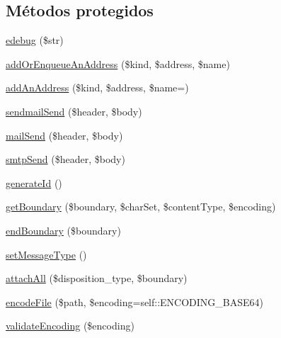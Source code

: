 \subsection*{Métodos protegidos}
\begin{DoxyCompactItemize}
\item 
\hyperlink{classPHPMailer_1_1PHPMailer_1_1PHPMailer_a39eadd6ab95a3dc3c7ec249fd694f021}{edebug} (\$str)
\item 
\hyperlink{classPHPMailer_1_1PHPMailer_1_1PHPMailer_aa86fcba6dc090d7d0993051b05401833}{add\+Or\+Enqueue\+An\+Address} (\$kind, \$address, \$name)
\item 
\hyperlink{classPHPMailer_1_1PHPMailer_1_1PHPMailer_a9281f271c8a70ff129d09c9755958b98}{add\+An\+Address} (\$kind, \$address, \$name=\textquotesingle{}\textquotesingle{})
\item 
\hyperlink{classPHPMailer_1_1PHPMailer_1_1PHPMailer_a5a0864c32614e5aee41be5e8dd9308b0}{sendmail\+Send} (\$header, \$body)
\item 
\hyperlink{classPHPMailer_1_1PHPMailer_1_1PHPMailer_a5380946f99759aa0cd61066638f8ba27}{mail\+Send} (\$header, \$body)
\item 
\hyperlink{classPHPMailer_1_1PHPMailer_1_1PHPMailer_a16204aee570cc970cb6d1a68202dfbe2}{smtp\+Send} (\$header, \$body)
\item 
\hyperlink{classPHPMailer_1_1PHPMailer_1_1PHPMailer_a6ac2799cc5bd5bbd315401918dcdf7de}{generate\+Id} ()
\item 
\hyperlink{classPHPMailer_1_1PHPMailer_1_1PHPMailer_a811b6fed7b4acf9f4de590df96ebdc24}{get\+Boundary} (\$boundary, \$char\+Set, \$content\+Type, \$encoding)
\item 
\hyperlink{classPHPMailer_1_1PHPMailer_1_1PHPMailer_ad70ecd8d4b18806949f5f19ec4f4aada}{end\+Boundary} (\$boundary)
\item 
\hyperlink{classPHPMailer_1_1PHPMailer_1_1PHPMailer_a8ef8984a547a5ef08d030addac0db019}{set\+Message\+Type} ()
\item 
\hyperlink{classPHPMailer_1_1PHPMailer_1_1PHPMailer_a0c36e1bd1e5a83ad4edb4f7f3e0f211c}{attach\+All} (\$disposition\+\_\+type, \$boundary)
\item 
\hyperlink{classPHPMailer_1_1PHPMailer_1_1PHPMailer_ace817a44b755bb05325da297aff54cc9}{encode\+File} (\$path, \$encoding=self\+::\+E\+N\+C\+O\+D\+I\+N\+G\+\_\+\+B\+A\+S\+E64)
\item 
\hyperlink{classPHPMailer_1_1PHPMailer_1_1PHPMailer_ace406e09f9eada020abdac1e396ee426}{validate\+Encoding} (\$encoding)
\item 

\end{DoxyCompactItemize}
